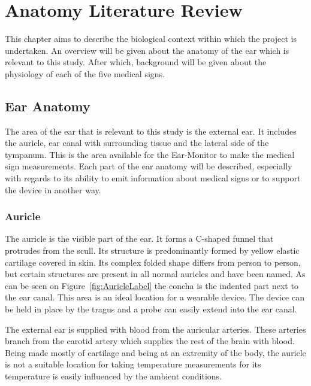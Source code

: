 \chapter{Anatomy Literature Review}
\label{chp:AnatomyLit}
This chapter aims to describe the biological context within which the project is undertaken. An overview will be given about the anatomy of the ear which is relevant to this study. After which, background will be given about the physiology of each of the five medical signs.

\section{Ear Anatomy} %
The area of the ear that is relevant to this study is the external ear. It includes the auricle, ear canal with surrounding tissue and the lateral side of the tympanum. This is the area available for the Ear-Monitor to make the medical sign measurements. Each part of the ear anatomy will be described, especially with regards to its ability to emit information about medical signs or to support the device in another way.

\subsection{Auricle}
The auricle is the visible part of the ear. It forms a C-shaped funnel that protrudes from the scull. Its structure is predominantly formed by yellow elastic cartilage covered in skin. Its complex folded shape differs from person to person, but certain structures are present in all normal auricles and have been named. As can be seen on Figure~\ref{fig:AuricleLabel} the concha is the indented part next to the ear canal. This area is an ideal location for a wearable device. The device can be held in place by the tragus and a probe can easily extend into the ear canal.

\medskip

The external ear is supplied with blood from the auricular arteries. These arteries branch from the carotid artery which supplies the rest of the brain with blood. Being made mostly of cartilage and being at an extremity of the body, the auricle is not a suitable location for taking temperature measurements for its temperature is easily influenced by the ambient conditions.

\medskip

